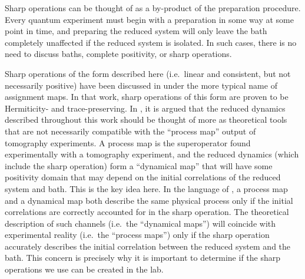 Sharp operations can be thought of as a by-product of the preparation procedure.  Every quantum experiment must begin with a preparation in some way at some point in time, and preparing the reduced system will only leave the bath completely unaffected if the reduced system is isolated.  In such cases, there is no need to discuss baths, complete positivity, or sharp operations.

Sharp operations of the form described here (i.e.\ linear and consistent, but not necessarily positive) have been discussed in \cite{Rodriguez2010} under the more typical name of assignment maps.  In that work, sharp operations of this form are proven to be Hermiticity- and trace-preserving.  In \cite{Sudarshen2007}, it is argued that the reduced dynamics described throughout this work should be thought of more as theoretical tools that are not necessarily compatible with the ``process map'' output of tomography experiments.  A process map is the superoperator found experimentally with a tomography experiment, and the reduced dynamics (which include the sharp operation) form a ``dynamical map'' that will have some positivity domain that may depend on the initial correlations of the reduced system and bath.  This is the key idea here.  In the language of \cite{Sudarshen2007}, a process map and a dynamical map both describe the same physical process only if the initial correlations are correctly accounted for in the sharp operation.  The theoretical description of such channels (i.e.\ the ``dynamical maps'') will coincide with experimental reality (i.e.\ the ``process maps'') only if the sharp operation accurately describes the initial correlation between the reduced system and the bath.  This concern is precisely why it is important to determine if the sharp operations we use can be created in the lab.   

